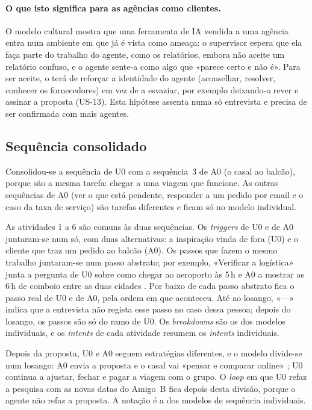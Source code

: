 \paragraph{O que isto significa para as agências como clientes.} O modelo cultural mostra que uma ferramenta de IA vendida a uma agência entra num ambiente em que já é vista como ameaça: o supervisor espera que ela faça parte do trabalho do agente, como os relatórios, embora não aceite um relatório confuso, e o agente sente-a como algo que «parece certo e não é». Para ser aceite, o \projeto{} terá de reforçar a identidade do agente (aconselhar, resolver, conhecer os fornecedores) em vez de a esvaziar, por exemplo deixando-o rever e assinar a proposta (US-13). Esta hipótese assenta numa só entrevista e precisa de ser confirmada com mais agentes.

\subsection{Sequência consolidado}\label{sec:seq-cons}
Consolidou-se a sequência de U0 com a sequência~3 de A0 (o casal ao balcão),
porque são a mesma tarefa: chegar a uma viagem que funcione. As
outras sequências de A0 (ver o que está pendente, responder a um pedido por email
e o caso da taxa de serviço) são tarefas diferentes e ficam só no modelo
individual.

As atividades 1 a 6 são comuns às duas sequências. Os \textit{triggers} de U0 e
de A0 juntaram-se num só, com duas alternativas: a inspiração vinda de fora (U0)
e o cliente que traz um pedido ao balcão (A0). Os passos que fazem o mesmo
trabalho juntaram-se num passo abstrato; por exemplo, «Verificar a logística»
junta a pergunta de U0 sobre como chegar ao aeroporto às 5\,h  e A0 a
mostrar as 6\,h de comboio entre as duas cidades . Por baixo de cada
passo abstrato fica o passo real de U0 e de A0, pela ordem em que aconteceu. Até
ao losango, «---» indica que a entrevista não regista esse passo no caso dessa
pessoa; depois do losango, os passos são só do ramo de U0. Os \textit{breakdowns}
são os dos modelos individuais, e os \textit{intents} de cada atividade resumem os
\textit{intents} individuais.

Depois da proposta, U0 e A0 seguem estratégias diferentes, e o modelo divide-se
num losango: A0 envia a proposta e o casal vai «pensar e comparar online» ; U0 continua a ajustar,
fechar e pagar a viagem com o grupo. O \textit{loop} em que U0 refaz a pesquisa
com as novas datas do Amigo~B  fica depois desta divisão, porque o
agente não refaz a proposta. A notação é a dos modelos de sequência individuais.

